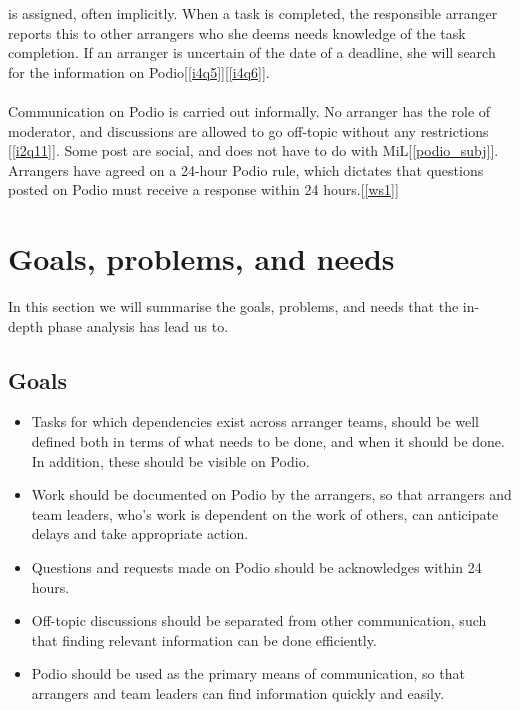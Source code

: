 is assigned, often implicitly. When a task is completed, the responsible
arranger reports this to other arrangers who she deems needs knowledge of the
task completion. If an arranger is uncertain of the date of a deadline, she will search for the information on Podio[\ref{i4q5}][\ref{i4q6}].
\\ \\
Communication on Podio is carried out informally. No arranger has the role of moderator, and discussions are allowed to go off-topic without any restrictions [\ref{i2q11}]. Some post are social, and does not have to do with MiL[\ref{podio_subj}]. Arrangers have agreed on a 24-hour Podio rule, which dictates that questions posted on Podio must receive a response within 24 hours.[\ref{ws1}]

\section{Goals, problems, and needs}
\label{sec:goprne}
In this section we will summarise the goals, problems, and needs that the
in-depth phase analysis has lead us to.

\subsection{Goals}
\label{subsec:goals}
\begin{itemize}
    \item Tasks for which dependencies exist across arranger teams, should be
    well defined both in terms of what needs to be done, and when it should be done. In addition, these should be visible on Podio.
    \item Work should be documented on Podio by the arrangers, so that arrangers and team leaders, who's work is dependent on the work of others, can anticipate delays and take appropriate action.
    \item Questions and requests made on Podio should be acknowledges within 24 hours.
    \item Off-topic discussions should be separated from other communication, such that finding relevant information can be done efficiently.
    \item Podio should be used as the primary means of communication, so that arrangers and team leaders can find information quickly and easily.
\end{itemize}

